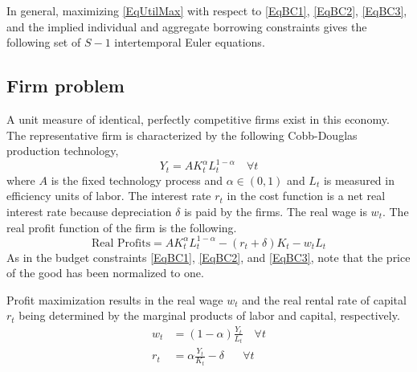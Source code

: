 \documentclass[letterpaper,12pt]{article}
\theoremstyle{definition}
\begin{document}
\begin{spacing}{1.5}
    In general, maximizing \eqref{EqUtilMax} with respect to \eqref{EqBC1}, \eqref{EqBC2}, \eqref{EqBC3}, and the implied individual and aggregate borrowing constraints gives the following set of $S-1$ intertemporal Euler equations.


  \subsection{Firm problem}\label{SecModelGenFirm}

    A unit measure of identical, perfectly competitive firms exist in this economy. The representative firm is characterized by the following Cobb-Douglas production technology,
    \begin{equation}\label{EqCobbDougProd}
       Y_t = A K_t^\alpha L_t^{1-\alpha} \quad \forall t
    \end{equation}
    where $A$ is the fixed technology process and $\alpha\in(0,1)$ and $L_t$ is measured in efficiency units of labor. The interest rate $r_t$ in the cost function is a net real interest rate because depreciation $\delta$ is paid by the firms. The real wage is $w_t$. The real profit function of the firm is the following.
    \begin{equation}\label{EqFirmProfit}
       \text{Real Profits} = A K_t^\alpha L_t^{1-\alpha} - (r_t + \delta)K_t - w_t L_t
    \end{equation}
    As in the budget constraints \eqref{EqBC1}, \eqref{EqBC2}, and \eqref{EqBC3}, note that the price of the good has been normalized to one.

    Profit maximization results in the real wage $w_t$ and the real rental rate of capital $r_t$ being determined by the marginal products of labor and capital, respectively.
    \begin{align}
       w_t &= (1-\alpha)\frac{Y_t}{L_t} \quad \forall t \label{EqFOCwage}\\
       r_t &= \alpha\frac{Y_t}{K_t} - \delta \quad\:\:\: \forall t \label{EqFOCrate}
    \end{align}



\end{spacing}
\end{document}
